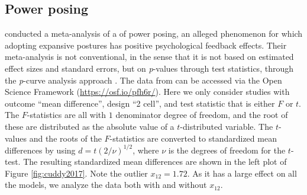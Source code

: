 \documentclass{article}
\theoremstyle{plain}
\theoremstyle{definition}
\renewcommand{\sqrt}[1]{(#1)^{1/2}}
\begin{document}
\subsection{Power posing\label{subsec:cuddy2018}}

\citet{cuddy2018p} conducted a meta-analysis of a of power posing, an alleged phenomenon for which adopting expansive postures has positive psychological feedback effects. Their meta-analysis is not conventional, in the sense that it is not based on estimated effect sizes and standard errors, but on \textit{p}-values through test statistics, through the \textit{p}-curve analysis approach \citep{simonsohn2014p}. The data from \citet{cuddy2018p} can be accessed via the Open Science Framework (\url{https://osf.io/pfh6r/}). Here we only consider studies with outcome ``mean difference'', design ``2 cell'', and test statistic that is either $F$ or $t$. The $F$-statistics are all with $1$ denominator degree of freedom, and the root of these are distributed as the absolute value of a $t$-distributed variable. The $t$-values and the roots of the $F$-statistics are converted to standardized mean differences by using $d = t\sqrt{2/\nu}$, where $\nu$ is the degrees of freedom for the $t$-test. The resulting standardized mean differences are shown in the left plot of Figure \ref{fig:cuddy2017}. Note the outlier $x_{12} = 1.72$. As it has a large effect on all the models, we analyze the data both with and without $x_{12}$.
\end{document}

